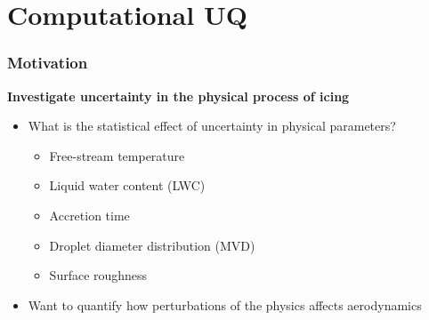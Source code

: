 \documentclass[9pt]{beamer}
\begin{document}
\section{Computational UQ}
\label{sec-3}
\begin{frame}
\frametitle{Motivation}
\label{sec-3-1}

\textbf{Investigate uncertainty in the physical process of icing}
\begin{itemize}
\item What is the statistical effect of uncertainty in physical parameters?
\begin{itemize}
\item Free-stream temperature
\item Liquid water content (LWC)
\item Accretion time
\item Droplet diameter distribution (MVD)
\item Surface roughness
\end{itemize}
\item Want to quantify how perturbations of the physics affects aerodynamics
\end{itemize}
\end{frame}
\end{document}

